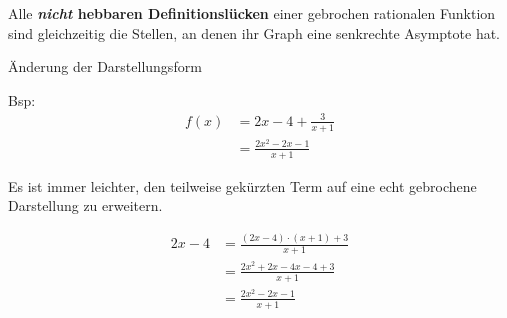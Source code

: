 \documentclass[paper=a6,ngerman,twoside=true,fontsize=14pt, parskip = half]{scrartcl}
\begin{document}
\begin{antwort}
		Alle \textbf{\emph{nicht} hebbaren Definitionslücken} 
		einer gebrochen rationalen 
		Funktion sind gleichzeitig die Stellen, 
		an denen ihr Graph eine senkrechte Asymptote hat.
\end{antwort}
\begin{frage}
	Änderung der Darstellungsform \bigskip
	
	Bsp: 
	\begin{align*}
	f(x)&=2x -4 +\frac{3}{x+1}\\
	&=\frac{2x^2-2x-1}{x+1}
	\end{align*}
\end{frage}
\begin{antwort}
	Es ist immer leichter, den teilweise 
	gekürzten Term auf eine echt gebrochene Darstellung zu erweitern.
		
	\begin{align*}
		2x-4&=\frac{(2x-4)\cdot(x+1)+3}{x+1} \\
		&=\frac{2x^2+2x-4x-4+3}{x+1} \\
		&=\frac{2x^2-2x-1}{x+1}
	\end{align*}
\end{antwort}
\end{document}
